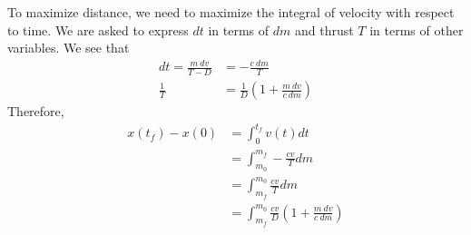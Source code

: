 \documentclass[12pt]{article}
\begin{document}
\begin{problem}[3]
To maximize distance, we need to maximize the integral of velocity with respect to time. We are asked to express $ dt$ in terms of  $ dm$ and thrust  $ T$ in terms of other variables. We see that
\begin{align*}
	dt = \frac{m\ dv}{ T-D} &= - \frac{c\ dm}{ T} \\
	\frac{1}{T} &= \frac{1}{D} \left( 1+ \frac{m\ dv}{ c\ dm} \right) 
\end{align*}
Therefore,
\begin{align*}
	x(t_f) - x(0) &= \int_{ 0}^{ t_f} v(t) dt   \\
	&= \int_{ m_0}^{ m_f} - \frac{ cv}{ T} dm   \\
	&= \int_{ m_f}^{ m_0} \frac{c v}{ T} dm \\
	&= \int_{ m_f}^{ m_0}\frac{c v}{ D} \left( 1+ \frac{m\ dv}{ c\ dm} \right)    
\end{align*}
\end{problem}
\end{document}
